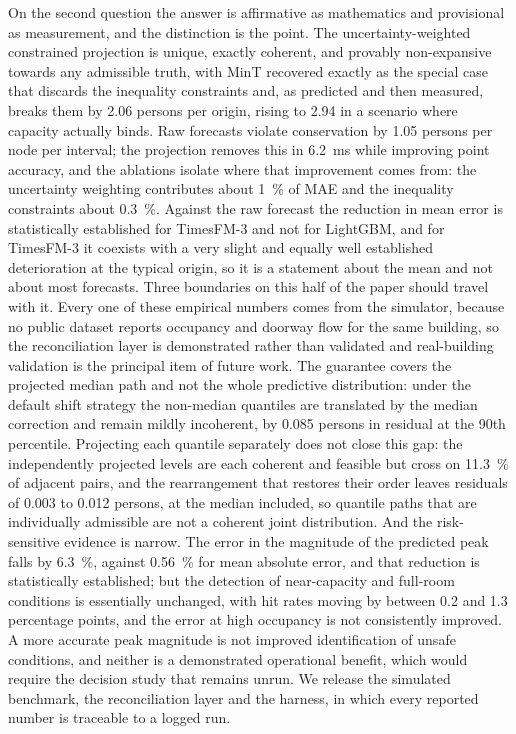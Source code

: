 \documentclass[utf8]{FrontiersinHarvard}
\newif\ifrevisionmarkup
\newcommand{\new}[1]{\ifrevisionmarkup\textcolor{revision}{#1}\else#1\fi}
\newif\ifsecondrevisionmarkup
\newcommand{\rev}[1]{\ifsecondrevisionmarkup\textcolor{revisiontwo}{#1}\else#1\fi}
\theoremstyle{plain}
\theoremstyle{definition}
\theoremstyle{remark}
\begin{document}
On the second question the answer \new{is affirmative as mathematics and provisional as measurement, and the distinction is the point}. The uncertainty-weighted constrained projection is unique, exactly coherent, and provably non-expansive towards any admissible truth, with MinT recovered exactly as the special case that discards the inequality constraints and, as predicted and then measured, breaks them by \num{2.06} persons per origin, rising to \num{2.94} in a scenario where capacity actually binds. Raw forecasts violate conservation by \num{1.05} persons per node per interval; the projection removes this in \SI{6.2}{\milli\second} while improving point accuracy, and the ablations isolate where that improvement comes from: the uncertainty weighting contributes about \SI{1}{\percent} of \rev{MAE} and the inequality constraints about \SI{0.3}{\percent}. \rev{Against the raw forecast the reduction in mean error is statistically established for TimesFM-3 and not for LightGBM, and for TimesFM-3 it coexists with a very slight and equally well established deterioration at the typical origin, so it is a statement about the mean and not about most forecasts.} \new{Three boundaries on this half of the paper should travel with it. Every one of these empirical numbers comes from the simulator, because no public dataset reports occupancy and doorway flow for the same building, so the reconciliation layer is demonstrated rather than validated and real-building validation is the principal item of future work. The guarantee covers the projected median path and not the whole predictive distribution: under the default shift strategy the non-median quantiles are translated by the median correction and remain mildly incoherent, by \num{0.085} persons in residual at the \rev{\num{90}th} percentile\rev{. Projecting each quantile separately does not close this gap: the independently projected levels are each coherent and feasible but cross on \SI{11.3}{\percent} of adjacent pairs, and the rearrangement that restores their order leaves residuals of \num{0.003} to \num{0.012} persons, at the median included, so quantile paths that are individually admissible are not a coherent joint distribution. And the risk-sensitive evidence is narrow. The error in the magnitude of the predicted peak falls by \SI{6.3}{\percent}, against \SI{0.56}{\percent} for mean absolute error, and that reduction is statistically established; but the detection of near-capacity and full-room conditions is essentially unchanged, with hit rates moving by between \num{0.2} and \num{1.3} percentage points, and the error at high occupancy is not consistently improved. A more accurate peak magnitude is not improved identification of unsafe conditions, and neither is a demonstrated operational benefit, which would require the decision study that remains unrun}.} We release the simulated benchmark, the reconciliation layer and the harness, in which every reported number is traceable to a logged run.
\end{document}
